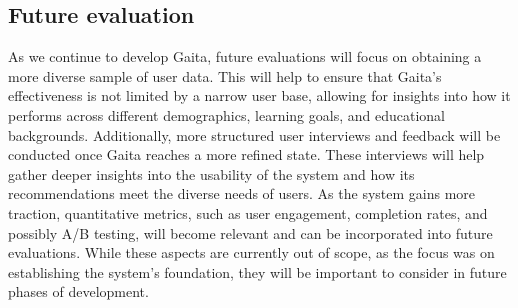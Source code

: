 \subsection{Future evaluation}

As we continue to develop Gaita, future evaluations will focus on obtaining a more diverse sample of user data. This will help to ensure that Gaita’s effectiveness is not limited by a narrow user base, allowing for insights into how it performs across different demographics, learning goals, and educational backgrounds. Additionally, more structured user interviews and feedback will be conducted once Gaita reaches a more refined state. These interviews will help gather deeper insights into the usability of the system and how its recommendations meet the diverse needs of users. As the system gains more traction, quantitative metrics, such as user engagement, completion rates, and possibly A/B testing, will become relevant and can be incorporated into future evaluations. While these aspects are currently out of scope, as the focus was on establishing the system’s foundation, they will be important to consider in future phases of development.
